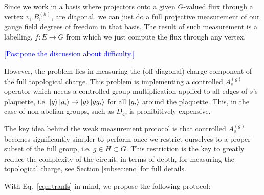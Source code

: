 \documentclass[two column]{article}
\newcommand{\caro}[1]{\textcolor{red}{[#1]}}
\newcommand{\jovan}[1]{\textcolor{blue}{[#1]}}
\begin{document}
Since we work in a basis where projectors onto a given $G$-valued flux through a vertex $v$, $B_v^{(h)}$, are diagonal, we can just do a full projective measurement of our gauge field degrees of freedom in that basis. 
The result of such measurement is a labelling, $f: E \rightarrow G$ from which we just compute the flux through any vertex. 

\jovan{Postpone the discussion about difficulty.}

However, the problem lies in measuring the (off-diagonal) charge component of the full topological charge.
This problem is implementing a controlled $A^{(g)}_s$ operator which needs a controlled group multiplication applied to all edges of $s$'s plaquette, i.e. $\ket{g}\ket{g_i} \rightarrow \ket{g}\ket{gg_i}$ for all $\ket{g_i}$ around the plaquette.
This, in the case of non-abelian groups, such as $D_4$, is prohibitively expensive. 



The key idea behind the weak measurement protocol is that controlled $A_s^{(g)}$ becomes significantly simpler to perform once we restrict ourselves to a proper subset of the full group, i.e. $g \in H \subset G$.
This restriction is the key to greatly reduce the complexity of the circuit, in terms of depth, for measuring the topological charge,
see Section \ref{subsec:enc} for full details.

With Eq.~\eqref{eqn:tranfs} in mind, we propose the following protocol:
\end{document}
